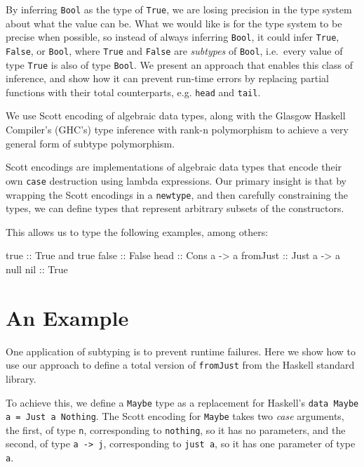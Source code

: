 \documentclass[]{article}
\newenvironment{Shaded}{}{}
\newcommand{\DataTypeTok}[1]{\textcolor[rgb]{0.56,0.13,0.00}{{#1}}}
\newcommand{\OtherTok}[1]{\textcolor[rgb]{0.00,0.44,0.13}{{#1}}}
\newcommand{\NormalTok}[1]{{#1}}
\begin{document}
By inferring \texttt{Bool} as the type of \texttt{True}, we are losing
precision in the type system about what the value can be. What we would
like is for the type system to be precise when possible, so instead of
always inferring \texttt{Bool}, it could infer \texttt{True},
\texttt{False}, or \texttt{Bool}, where \texttt{True} and \texttt{False}
are \emph{subtypes} of \texttt{Bool}, i.e.~every value of type
\texttt{True} is also of type \texttt{Bool}. We present an approach that
enables this class of inference, and show how it can prevent run-time
errors by replacing partial functions with their total counterparts,
e.g. \texttt{head} and \texttt{tail}.

We use Scott encoding of algebraic data types, along with the Glasgow
Haskell Compiler's (GHC's) type inference with rank-n polymorphism to
achieve a very general form of subtype polymorphism.

Scott encodings are implementations of algebraic data types that encode
their own \texttt{case} destruction using lambda expressions. Our
primary insight is that by wrapping the Scott encodings in a
\texttt{newtype}, and then carefully constraining the types, we can
define types that represent arbitrary subsets of the constructors.

This allows us to type the following examples, among others:

\begin{Shaded}
\begin{Highlighting}[]
\OtherTok{   true ::} \DataTypeTok{True}
   \NormalTok{and true}\OtherTok{ false ::} \DataTypeTok{False}
\OtherTok{   head ::} \DataTypeTok{Cons} \NormalTok{a }\OtherTok{->} \NormalTok{a}
\OtherTok{   fromJust ::} \DataTypeTok{Just} \NormalTok{a }\OtherTok{->} \NormalTok{a}
   \NormalTok{null}\OtherTok{ nil ::} \DataTypeTok{True}
\end{Highlighting}
\end{Shaded}

\section{An Example}\label{an-example}

One application of subtyping is to prevent runtime failures. Here we
show how to use our approach to define a total version of
\texttt{fromJust} from the Haskell standard library.

To achieve this, we define a \texttt{Maybe} type as a replacement for
Haskell's \texttt{data Maybe a = Just a \textbar{} Nothing}. The Scott
encoding for \texttt{Maybe} takes two \emph{case} arguments, the first,
of type \texttt{n}, corresponding to \texttt{nothing}, so it has no
parameters, and the second, of type \texttt{a -\textgreater{} j},
corresponding to \texttt{just a}, so it has one parameter of type
\texttt{a}.
\end{document}
